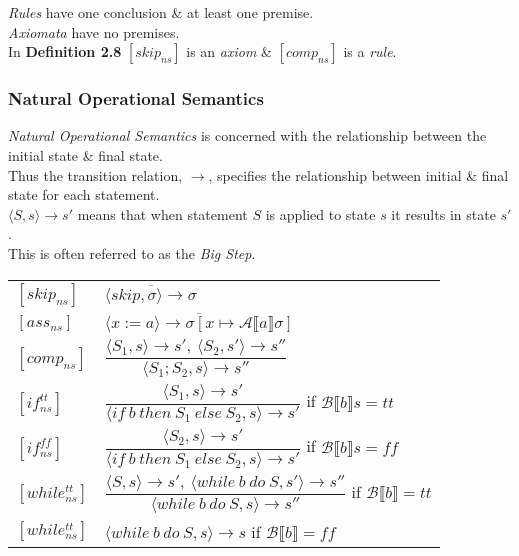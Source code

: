 \documentclass[11pt,a4paper]{article}
\begin{document}
\textit{Rules} have one conclusion \& at least one premise.\\
\textit{Axiomata} have no premises.\\
\NB In \textbf{Definition 2.8} $[skip_{ns}]$ is an \textit{axiom} \& $[comp_{ns}]$ is a \textit{rule}.

\subsubsection{Natural Operational Semantics}

\textit{Natural Operational Semantics} is concerned with the relationship between the initial state \& final state.\\
Thus the transition relation, $\to$, specifies the relationship between initial \& final state for each statement.\\
$\langle S,s\rangle\to s'$ means that when statement $S$ is applied to state $s$ it results in state $s'$.\\
\NB This is often referred to as the \textit{Big Step}.\\

\begin{tabular}{ll}
$[skip_{ns}]$&$\overline{\langle skip,\sigma\rangle\to\sigma}$\\
$[ass_{ns}]$&$\overline{\langle x:=a\rangle\to\sigma[x\mapsto\mathcal{A}\llbracket  a\rrbracket\sigma]}$\\
$[comp_{ns}]$&$\dfrac{\langle S_1,s\rangle\to s',\ \langle S_2,s'\rangle\to s''}{\langle S_1;S_2,s\rangle\to s''}$\\
$[if_{ns}^{tt}]$&$\dfrac{\langle S_1,s\rangle\to s'}{\langle if\ b\ then\ S_1\ else\ S_2,s\rangle\to s'}$ if $\mathcal{B}\llbracket  b\rrbracket s=tt$\\
$[if_{ns}^{ff}]$&$\dfrac{\langle S_2,s\rangle\to s'}{\langle if\ b\ then\ S_1\ else\ S_2,s\rangle\to s'}$ if $\mathcal{B}\llbracket  b\rrbracket s=ff$\\
$[while_{ns}^{tt}]$&$\dfrac{\langle S,s\rangle\to s',\ \langle while\ b\ do\ S,s'\rangle\to s''}{\langle while\ b\ do\ S,s\rangle\to s''}$ if $\mathcal{B}\llbracket  b\rrbracket=tt$\\
$[while_{ns}^{tt}]$&$\langle while\ b\ do\ S,s\rangle\to s$ if $\mathcal{B}\llbracket  b\rrbracket=ff$
\end{tabular}\\
\end{document}
